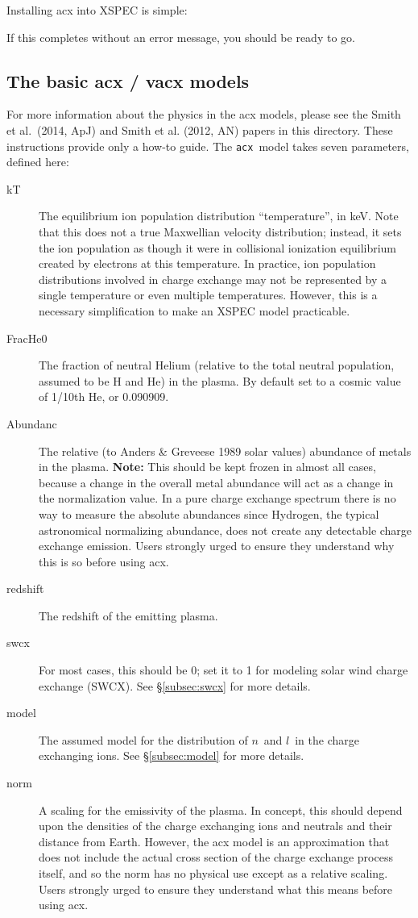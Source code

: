 \documentclass[11pt]{article}
\newcommand{\version}{1.0.1}
\begin{document}
Installing acx into XSPEC is simple:

\noindent {\tt XSPEC$>$\ lmod acx /path/to/acx-\version/xspec}

If this completes without an error message, you should be ready to go.

\subsection*{The basic acx / vacx models}

For more information about the physics in the acx models, please see
the Smith et al.\ (2014, ApJ) and Smith et al. (2012, AN) papers in
this directory.  These 
instructions provide only a how-to guide.  The {\tt acx}\ model takes
seven parameters, defined here:
\begin{description}
\item[kT] The equilibrium ion population distribution ``temperature'',
  in keV.  Note that this does not a true Maxwellian velocity
  distribution; instead, it sets the ion population as though it were
  in collisional ionization equilibrium created by electrons at this
  temperature.  In practice, ion population distributions involved in
  charge exchange may not be represented by a single temperature or
  even multiple temperatures.  However, this is a necessary
  simplification to make an XSPEC model practicable.  
\item[FracHe0] The fraction of neutral Helium (relative to the total
  neutral population, assumed to be H and He) in the plasma.  By
  default set to a cosmic value of 1/10th He, or 0.090909.
\item[Abundanc] The relative (to Anders \& Greveese 1989 solar values)
  abundance of metals in the plasma.  {\bf Note:} This should be kept
  frozen in almost all cases, because a change in the overall metal
  abundance will act as a change in the normalization value.  In a
  pure charge exchange spectrum there is no way to measure the
  absolute abundances since Hydrogen, the typical astronomical
  normalizing abundance, does not create any detectable charge
  exchange emission.  Users strongly urged to ensure they understand
  why this is so before using acx.
\item[redshift] The redshift of the emitting plasma.  
\item[swcx] For most cases, this should be 0; set it to 1 for modeling
  solar wind charge exchange (SWCX).  See \S\ref{subsec:swcx} for more details.
\item[model] The assumed model for the distribution of $n$\ and $l$\
  in the charge exchanging ions.  See \S\ref{subsec:model} for more details.
\item[norm] A scaling for the emissivity of the plasma.  In concept,
  this should depend upon the densities of the charge exchanging ions
  and neutrals and their distance from Earth.  However, the acx model
  is an approximation that does not include the actual cross section
  of the charge exchange process itself, and so the norm has no
  physical use except as a relative scaling.  Users strongly urged to
  ensure they understand what this means before using acx.
\end{description}
\end{document}
